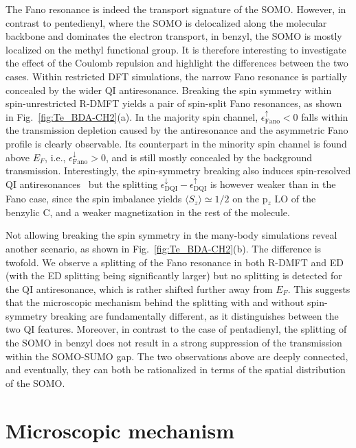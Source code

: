 \documentclass[aps,prx,twocolumn,superscriptaddress]{revtex4-2}
\begin{document}
The Fano resonance is indeed the transport signature of the SOMO. 
However, in contrast to pentedienyl, where the SOMO is delocalized along the molecular backbone 
and dominates the electron transport, 
in benzyl, the SOMO is mostly localized on the methyl functional group. 
It is therefore interesting to investigate the effect of the Coulomb repulsion and highlight the differences between the two cases.  
Within restricted DFT simulations, the narrow Fano resonance is partially concealed by the wider QI antiresonance.  
Breaking the spin symmetry within spin-unrestricted R-DMFT yields a pair of spin-split Fano resonances, 
as shown in Fig.~\ref{fig:Te_BDA-CH2}(a). 
In the majority spin channel, $\epsilon^{\uparrow}_{\mathrm{Fano}}<0$ 
falls within the transmission depletion caused by the antiresonance 
and the asymmetric Fano profile is clearly observable. 
Its counterpart in the minority spin channel is found above $E_F$, i.e., $\epsilon^{\downarrow}_{\mathrm{Fano}}>0$,   
and is still mostly concealed by the background transmission. 
Interestingly, the spin-symmetry breaking also induces 
spin-resolved QI antiresonances~\cite{valliNL18,valliPRB100,phungPRB102} 
but the splitting $\epsilon^{\downarrow}_{\mathrm{DQI}}-\epsilon^{\uparrow}_{\mathrm{DQI}}$ 
is however weaker than in the Fano case, since the spin imbalance 
yields $\langle S_z \rangle \simeq 1/2$ on the p$_z$ LO of the benzylic C, 
and a weaker magnetization in the rest of the molecule.  

Not allowing breaking the spin symmetry in the many-body simulations reveal another scenario, 
as shown in Fig.~\ref{fig:Te_BDA-CH2}(b). 
The difference is twofold. 
We observe a splitting of the Fano resonance in both R-DMFT and ED (with the ED splitting being significantly larger) 
but no splitting is detected for the QI antiresonance, which is rather shifted further away from $E_F$. 
This suggests that the microscopic mechanism behind the splitting with and without spin-symmetry breaking 
are fundamentally different, as it distinguishes between the two QI features. 
Moreover, in contrast to the case of pentadienyl, 
the splitting of the SOMO in benzyl does not result in a strong suppression of the transmission within the SOMO-SUMO gap. 
The two observations above are deeply connected, and eventually, they can both be rationalized 
in terms of the spatial distribution of the SOMO. 



\section{Microscopic mechanism}\label{sec:mechanism}
\end{document}
